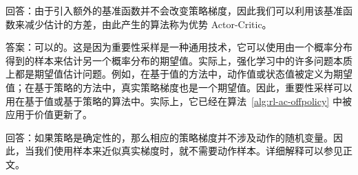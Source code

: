 \begin{note}
回答：由于引入额外的基准函数并不会改变策略梯度，因此我们可以利用该基准函数来减少估计的方差，由此产生的算法称为优势 Actor-Critic。
\end{note}

\begin{note}
答案：可以的。这是因为重要性采样是一种通用技术，它可以使用由一个概率分布得到的样本来估计另一个概率分布的期望值。实际上，强化学习中的许多问题本质上都是期望值估计问题。例如，在基于值的方法中，动作值或状态值被定义为期望值；在基于策略的方法中，真实策略梯度也是一个期望值。因此，重要性采样可以用在基于值或基于策略的算法中。实际上，它已经在算法~\ref{alg:rl-ac-offpolicy} 中被应用于价值更新了。
\end{note}

\begin{note}
回答：如果策略是确定性的，那么相应的策略梯度并不涉及动作的随机变量。因此，当我们使用样本来近似真实梯度时，就不需要动作样本。详细解释可以参见正文。
\end{note}
